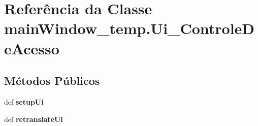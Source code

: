 \hypertarget{classmainWindow__temp_1_1Ui__ControleDeAcesso}{\section{\-Referência da \-Classe main\-Window\-\_\-temp.\-Ui\-\_\-\-Controle\-De\-Acesso}
\label{classmainWindow__temp_1_1Ui__ControleDeAcesso}
}
\subsection*{\-Métodos \-Públicos}
\begin{DoxyCompactItemize}
\item 
\hypertarget{classmainWindow__temp_1_1Ui__ControleDeAcesso_a9f4e4977a2e184cea628342ab3866187}{def {\bfseries setup\-Ui}}\label{classmainWindow__temp_1_1Ui__ControleDeAcesso_a9f4e4977a2e184cea628342ab3866187}

\item 
\hypertarget{classmainWindow__temp_1_1Ui__ControleDeAcesso_a8568af6ccf79316d89e2c76bb907ceca}{def {\bfseries retranslate\-Ui}}\label{classmainWindow__temp_1_1Ui__ControleDeAcesso_a8568af6ccf79316d89e2c76bb907ceca}

\end{DoxyCompactItemize}
